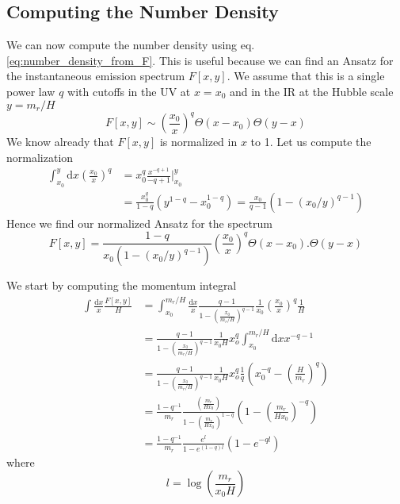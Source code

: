 \documentclass[a4paper]{article}
\begin{document}
\subsection{Computing the Number Density}
We can now compute the number density using eq. \eqref{eq:number_density_from_F}.
This is useful because we can find an Ansatz for the instantaneous emission spectrum $F[x, y]$.
We assume that this is a single power law $q$ with cutoffs in the UV at $x = x_0$ and in the IR at the Hubble scale $y = m_r/H$
\begin{equation}
	F[x, y] \sim \left(\frac{x_0}{x}\right)^q \Theta(x - x_0) \Theta(y - x)
\end{equation}
We know already that $F[x,y]$ is normalized in $x$ to 1. Let us compute the normalization
\begin{align}
	\int_{x_0}^{y} \mathrm{d} x \left(\frac{x_0}{x}\right)^q &= x_0^q \frac{x^{-q + 1}}{-q + 1}\Big|_{x_0}^y \\
	&= \frac{x_0^q}{1 - q}(y^{1 - q} - x_0^{1 - q}) = \frac{x_0}{q - 1} (1 - (x_0/y)^{q - 1})
\end{align}
Hence we find our normalized Ansatz for the spectrum
\begin{equation}
	F[x, y] = \frac{1 - q}{x_0(1 - (x_0/y)^{q - 1})} \left(\frac{x_0}{x}\right)^q \Theta(x - x_0). \Theta(y - x)
\end{equation}

We start by computing the momentum integral 
\begin{align}
	\int \frac{\mathrm{d} x}{x} \frac{F[x, y]}{H} &= 
	\int_{x_0}^{m_r/H} \frac{\mathrm{d} x}{x} \frac{q - 1}{1 - \left(\frac{x_0}{m_r/H}\right)^{q - 1}} \frac{1}{x_0} \left( \frac{x_0}{x} \right)^q \frac{1}{H} \\
	&=   \frac{q - 1}{1 - \left(\frac{x_0}{m_r/H}\right)^{q - 1}} \frac{1}{x_0 H} x_o^q \int_{x_0}^{m_r/H} \mathrm{d} x x^{-q - 1} \\
	&= \frac{q - 1}{1 - \left(\frac{x_0}{m_r/H}\right)^{q - 1}} \frac{1}{x_0 H} x_o^q \frac{1}{q} \left( x_0^{-q} - \left( \frac{H}{m_r}\right)^q \right) \\
	&= \frac{1 - q^{-1}}{m_r} \frac{\left(\frac{m_r}{H x_0}\right)}{1 - \left(\frac{m_r}{H x_0}\right)^{1 - q}} \left( 1 - \left(\frac{m_r}{H x_0}\right)^{-q} \right) \\
	&= \frac{1 - q^{-1}}{m_r} \frac{e^l}{1 - e^{(1 - q) l}} (1 - e^{-ql})
\end{align}
where
\begin{equation}
	l = \log \left( \frac{m_r}{x_0 H} \right)
\end{equation}
\end{document}
